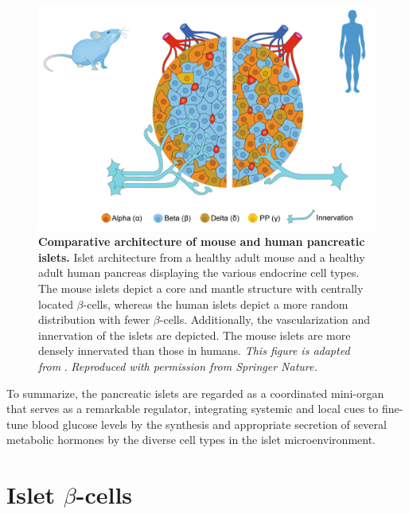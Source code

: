 \begin{figure}[H]
    \centering
    \includegraphics[width=12cm]{Chapter1/Fig/F1-2-1-01.png}
    \caption[Comparative architecture of mouse and human pancreatic islets]{\textbf{Comparative architecture of mouse and human pancreatic islets.} Islet architecture from a healthy adult mouse and a healthy adult human pancreas displaying the various endocrine cell types. The mouse islets depict a core and mantle structure with centrally located $\beta$-cells, whereas the human islets depict a more random distribution with fewer $\beta$-cells. Additionally, the vascularization and innervation of the islets are depicted. The mouse islets are more densely innervated than those in humans. \textit{This figure is adapted from }\textbf{\cite{jain_targeting_2022,noguchi_integrating_2019}}. \textit{ Reproduced with permission from Springer Nature.}}
    \label{fig:chp1_mouse_human_islets}
\end{figure}

\par To summarize, the pancreatic islets are regarded as a coordinated mini-organ that serves as a remarkable regulator, integrating systemic and local cues to fine-tune blood glucose levels by the synthesis and appropriate secretion of several metabolic hormones by the diverse cell types in the islet microenvironment.


\clearpage



\section{ Islet $\beta$-cells}  %
\label{sec:int_islet-betacells}  

